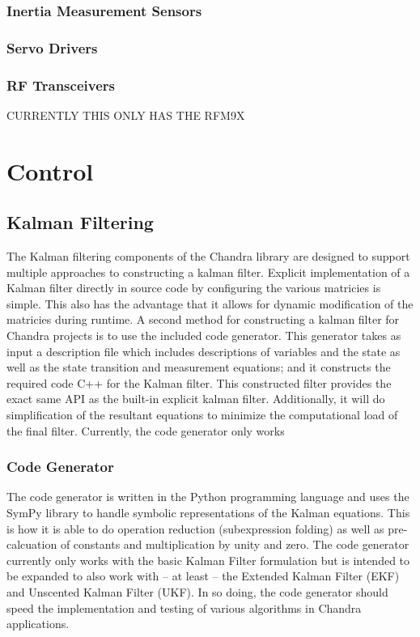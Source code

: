 \documentclass[10pt,letterpaper]{memoir} %
\begin{document}
\subsubsection{Inertia Measurement Sensors}
\subsubsection{Servo Drivers}
\subsubsection{RF Transceivers}
CURRENTLY THIS ONLY HAS THE RFM9X

\section{Control}
\subsection{Kalman Filtering}
The Kalman filtering components of the Chandra library are designed to support multiple approaches to constructing a kalman filter.  Explicit implementation of a Kalman filter directly in source code by configuring the various matricies is simple.  This also has the advantage that it allows for dynamic modification of the matricies during runtime.  A second method for constructing a kalman filter for Chandra projects is to use the included code generator.  This generator takes as input a description file which includes descriptions of variables and the state as well as the state transition and measurement equations; and it constructs the required code C++ for the Kalman filter.  This constructed filter provides the exact same API as the built-in explicit kalman filter.  Additionally, it will do simplification of the resultant equations to minimize the computational load of the final filter.  Currently, the code generator only works 

\subsubsection{Code Generator}
The code generator is written in the Python programming language and uses the SymPy library to handle symbolic representations of the Kalman equations.  This is how it is able to do operation reduction (subexpression folding) as well as pre-calcuation of constants and multiplication by unity and zero.  The code generator currently only works with the basic Kalman Filter formulation but is intended to be expanded to also work with -- at least -- the Extended Kalman Filter (EKF) and Unscented Kalman Filter (UKF).  In so doing, the code generator should speed the implementation and testing of various algorithms in Chandra applications.
\end{document}
